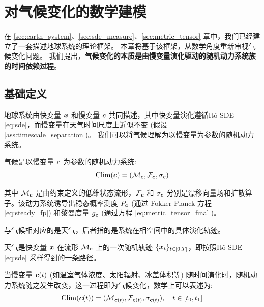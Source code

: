 \section{对气候变化的数学建模}
\label{sec:climate_change}

在 \ref{sec:earth_system}、\ref{sec:sde_measure}、\ref{sec:metric_tensor} 章中，我们已经建立了一套描述地球系统的理论框架。
本章将基于该框架，从数学角度重新审视气候变化问题。
我们提出，\textbf{气候变化的本质是由慢变量演化驱动的随机动力系统族的时间依赖过程}。

\subsection{基础定义}

地球系统由快变量 $\bm{x}$ 和慢变量 $\bm{c}$ 共同描述，其中快变量演化遵循Itô SDE \eqref{eq:sde}，而慢变量在天气时间尺度上近似不变 (假设 \ref{ass:timescale_separation})。
我们可以将气候理解为以慢变量为参数的随机动力系统。

\begin{definition}[气候]
\label{def:climate}
    气候是以慢变量 $\bm{c}$ 为参数的随机动力系统:
    \begin{equation}
    \label{eq:climate_system}
        \mathrm{Clim}(\bm{c}) = (\mathcal{M}_{\bm{c}}, \mathcal{F}_{\bm{c}}, \sigma_{\bm{c}})
    \end{equation}

    其中 $\mathcal{M}_{\bm{c}}$ 是由约束定义的低维状态流形，$\mathcal{F}_{\bm{c}}$ 和 $\sigma_{\bm{c}}$ 分别是漂移向量场和扩散算子。该动力系统诱导出稳态概率测度 $P_{\bm{c}}$ (通过 Fokker-Planck 方程 \eqref{eq:steady_fp}) 和黎曼度量 $g_{\bm{c}}$ (通过方程 \eqref{eq:metric_tensor_final})。
\end{definition}

与气候相对应的是天气，后者指的是系统在相空间中的具体演化轨迹。

\begin{definition}[天气]
\label{def:weather}
    天气是快变量 $\bm{x}$ 在流形 $\mathcal{M}_{\bm{c}}$ 上的一次随机轨迹 $\{\bm{x}_t\}_{t \in [0, T]}$，即按照Itô SDE \eqref{eq:sde} 采样得到的一条路径。
\end{definition}

当慢变量 $\bm{c}(t)$ (如温室气体浓度、太阳辐射、冰盖体积等) 随时间演化时，随机动力系统随之发生改变，这一过程即为气候变化，数学上可以表述为:
\begin{equation}
\label{eq:climate_change_evolution}
    \mathrm{Clim}(\bm{c}(t)) = (\mathcal{M}_{\bm{c}(t)}, \mathcal{F}_{\bm{c}(t)}, \sigma_{\bm{c}(t)}), \quad t \in [t_0, t_1]
\end{equation}

